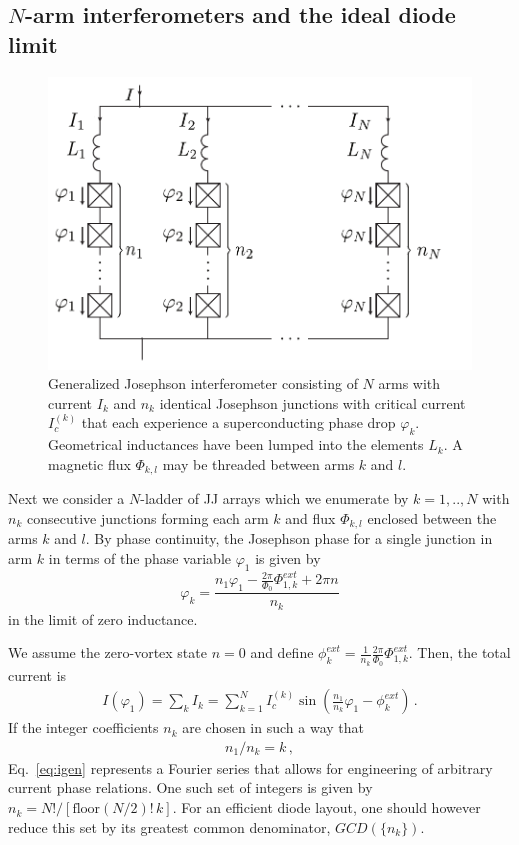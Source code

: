 \documentclass[aps,rsi,reprint,amsmath,amssymb,floatfix,longbibliography,superscriptaddress]{revtex4-1}
\begin{document}
\subsection{$N$-arm interferometers and the ideal diode limit}
\label{sec:generalization}
\begin{figure}[t]
	\centering
	\includegraphics[width=\columnwidth]{circuit-snail-inductive-generalized.pdf}
	\caption{Generalized Josephson interferometer consisting of
	$N$ arms with current $I_k$ and $n_k$ identical
	Josephson junctions with critical current $I_c^{(k)}$ that each experience a superconducting phase drop
	$\varphi_k$. Geometrical inductances have been lumped into 
	the elements $L_k$. A magnetic flux $\Phi_{k,l}$ may be threaded between arms $k$ and $l$.}
	\label{fig:circuit}
\end{figure}
Next we consider a $N$-ladder of JJ arrays which we enumerate by $k=1,..,N$
with $n_k$ consecutive junctions forming each arm $k$ and flux
$\Phi_{k,l}$ enclosed between the arms $k$ and $l$. By phase continuity, the Josephson phase for
a single junction in arm $k$ in terms of the phase variable $\varphi_1$ is given by
\begin{equation}
	\varphi_k = \frac{n_1\varphi_1 -
		\frac{2\pi}{\Phi_0}
	\Phi_{1,k}^{ext} + 2\pi n}{n_k}
	\label{eq:phase-bias-def}
\end{equation} 
in the limit of zero inductance.

We assume the zero-vortex state $n=0$ and define $\phi^{ext}_{k} =
\frac{1}{n_k}\frac{2\pi}{\Phi_0} \Phi_{1,k}^{ext}$.
Then, the total current is
\begin{align}
	I(\varphi_1) = 
	\sum_{k}^{}I_k
	=
	\sum_{k=1}^{N} I_c^{(k)} \sin \left( \frac{n_1}{n_k} \varphi_1 -
	\phi^{ext}_{k} \right) \,.
	\label{eq:igen}
\end{align}
If the integer coefficients $n_k$ are chosen in such a way
that 
\begin{align}
    n_1/n_k=k \,,
    \label{eq:intchoice}
\end{align}
Eq.~\eqref{eq:igen} represents a Fourier series that allows for engineering of arbitrary
current phase relations. 
One such set of integers is given by $n_k = N!/\left[\text{floor}(N/2)!\, k \right]$. For an efficient diode layout, one should however reduce this set by its greatest common denominator, $GCD(\{n_k\})$.
\end{document}
